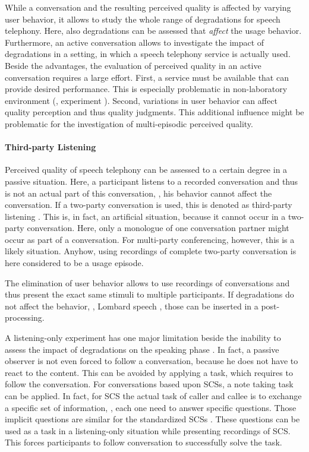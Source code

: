 While a conversation and the resulting perceived quality is affected by varying user behavior, it allows to study the whole range of degradations for speech telephony.
Here, also degradations can be assessed that \emph{affect} the usage behavior. %
Furthermore, an active conversation allows to investigate the impact of degradations in a setting, in which a speech telephony service is actually used.
Beside the advantages, the evaluation of perceived quality in an active conversation requires a large effort.
First, a service must be available that can provide desired performance.
This is especially problematic in non-laboratory environment (\cf, experiment ).
Second, variations in user behavior can affect quality perception and thus quality judgments.
This additional influence might be problematic for the investigation of multi-episodic perceived quality.

\paragraph*{Third-party Listening}
Perceived quality of speech telephony can be assessed  to a certain degree in a passive situation.
Here, a participant listens to a recorded conversation and thus is not an actual part of this conversation, \ie, his behavior cannot affect the conversation.
If a two-party conversation is used, this is denoted as third-party listening \citep[][p.~13]{itu-t_p.832:_2000}.
This is, in fact, an artificial situation, because it cannot occur in a two-party conversation.
Here, only a monologue of one conversation partner might occur as part of a conversation.
For multi-party conferencing, however, this is a likely situation.
Anyhow, using recordings of complete two-party conversation is here considered to be a usage episode.

The elimination of user behavior allows to use recordings of conversations and thus present the exact same stimuli to multiple participants.
If degradations do not affect the behavior, \eg, Lombard speech \citep[][p.~161]{moller_assessment_2000}, those can be inserted in a post-processing.

A listening-only experiment has one major limitation beside the inability to assess the impact of degradations on the speaking phase \citep{gueguin_evaluation_2008}.
In fact, a passive observer is not even forced to follow a conversation, because he does not have to react to the content.
This can be avoided by applying a task, which requires to follow the conversation.
For conversations based upon \acp{SCS}, a note taking task can be applied.
In fact, for \ac{SCS} the actual task of caller and callee is to exchange a specific set of information, \ie, each one need to answer specific questions.
Those implicit questions are similar for the standardized \acp{SCS} \citep{itu-t_p.805:_2007}.
These questions can be used as a task in a listening-only situation while presenting recordings of \ac{SCS}.
This forces participants to follow conversation to successfully solve the task.

